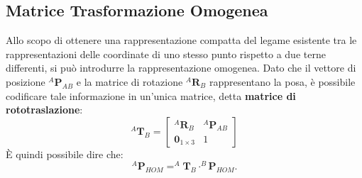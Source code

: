 \documentclass[11pt, a4paper]{report}
\begin{document}
\subsection{Matrice Trasformazione Omogenea}
Allo scopo di ottenere una rappresentazione compatta del legame esistente tra le rappresentazioni delle coordinate di uno stesso punto rispetto a due terne differenti, si può introdurre la rappresentazione omogenea. Dato che il vettore di posizione $ ^{A}\mathbf{P}_{AB} $ e la matrice di rotazione $ ^{A}\mathbf{R}_{B} $ rappresentano la posa, è possibile codificare tale informazione in un'unica matrice, detta \textbf{matrice di rototraslazione}:
\[
    ^{A}\mathbf{T}_{B} =
    \begin{bmatrix}
        ^{A}\mathbf{R}_{B} & ^{A}\mathbf{P}_{AB} \\
        \mathbf{0}_{1 \times 3} & 1
    \end{bmatrix}
\]
È quindi possibile dire che:
\[
    ^{A}\mathbf{P}_{HOM} = ^{A}\mathbf{T}_{B} \cdot ^{B}\mathbf{P}_{HOM}.
\]
\end{document}
